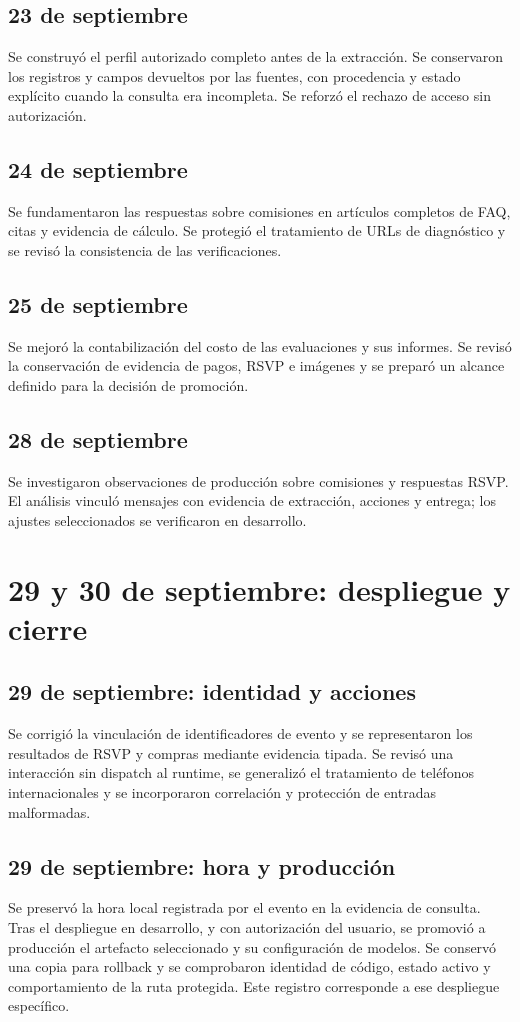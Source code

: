 \documentclass[
	a4paper,
	12pt,
]{CSSullivanBusinessReport}
\begin{document}
\subsection*{23 de septiembre}
Se construyó el perfil autorizado completo antes de la extracción. Se conservaron los registros y campos devueltos por las fuentes, con procedencia y estado explícito cuando la consulta era incompleta. Se reforzó el rechazo de acceso sin autorización.

\subsection*{24 de septiembre}
Se fundamentaron las respuestas sobre comisiones en artículos completos de FAQ, citas y evidencia de cálculo. Se protegió el tratamiento de URLs de diagnóstico y se revisó la consistencia de las verificaciones.

\subsection*{25 de septiembre}
Se mejoró la contabilización del costo de las evaluaciones y sus informes. Se revisó la conservación de evidencia de pagos, RSVP e imágenes y se preparó un alcance definido para la decisión de promoción.

\subsection*{28 de septiembre}
Se investigaron observaciones de producción sobre comisiones y respuestas RSVP. El análisis vinculó mensajes con evidencia de extracción, acciones y entrega; los ajustes seleccionados se verificaron en desarrollo.

\section{29 y 30 de septiembre: despliegue y cierre}
\subsection*{29 de septiembre: identidad y acciones}
Se corrigió la vinculación de identificadores de evento y se representaron los resultados de RSVP y compras mediante evidencia tipada. Se revisó una interacción sin dispatch al runtime, se generalizó el tratamiento de teléfonos internacionales y se incorporaron correlación y protección de entradas malformadas.

\subsection*{29 de septiembre: hora y producción}
Se preservó la hora local registrada por el evento en la evidencia de consulta. Tras el despliegue en desarrollo, y con autorización del usuario, se promovió a producción el artefacto seleccionado y su configuración de modelos. Se conservó una copia para rollback y se comprobaron identidad de código, estado activo y comportamiento de la ruta protegida. Este registro corresponde a ese despliegue específico.
\end{document}
